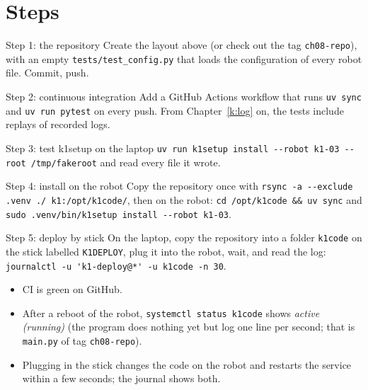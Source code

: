 \section*{Steps}
\begin{stepbox}{Step 1: the repository}
Create the layout above (or check out the tag \texttt{ch08-repo}), with an empty \texttt{tests/test\_config.py} that loads the configuration of every robot file. Commit, push.
\end{stepbox}
\begin{stepbox}{Step 2: continuous integration}
Add a GitHub Actions workflow that runs \verb!uv sync! and \verb!uv run pytest! on every push. From Chapter~\ref{k:log} on, the tests include replays of recorded logs.
\end{stepbox}
\begin{stepbox}{Step 3: test k1setup on the laptop}
\verb!uv run k1setup install --robot k1-03 --root /tmp/fakeroot! and read every file it wrote.
\end{stepbox}
\begin{stepbox}{Step 4: install on the robot}
Copy the repository once with \verb!rsync -a --exclude .venv ./ k1:/opt/k1code/!, then on the robot: \verb!cd /opt/k1code && uv sync! and \verb!sudo .venv/bin/k1setup install --robot k1-03!.
\end{stepbox}
\begin{stepbox}{Step 5: deploy by stick}
On the laptop, copy the repository into a folder \texttt{k1code} on the stick labelled \texttt{K1DEPLOY}, plug it into the robot, wait, and read the log: \verb!journalctl -u 'k1-deploy@*' -u k1code -n 30!.
\end{stepbox}

\begin{checkbox}
\begin{itemize}[nosep]
  \item CI is green on GitHub.
  \item After a reboot of the robot, \verb!systemctl status k1code! shows \emph{active (running)} (the program does nothing yet but log one line per second; that is \texttt{main.py} of tag \texttt{ch08-repo}).
  \item Plugging in the stick changes the code on the robot and restarts the service within a few seconds; the journal shows both.
\end{itemize}
\end{checkbox}

